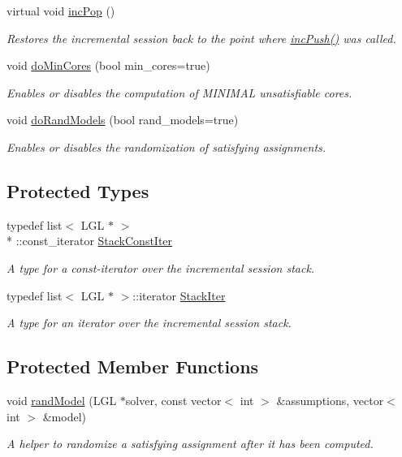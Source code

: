 \begin{DoxyCompactItemize}
virtual void \hyperlink{classLingelingApi_afe43e1243338a332803fff470eedbf7a}{inc\-Pop} ()
\begin{DoxyCompactList}\small\item\em Restores the incremental session back to the point where \hyperlink{classLingelingApi_a91c858d2a36a4fbe580909a793802a76}{inc\-Push()} was called. \end{DoxyCompactList}\item 
void \hyperlink{classSatSolver_a159fc9658709e5aeba2844a09454b2cb}{do\-Min\-Cores} (bool min\-\_\-cores=true)
\begin{DoxyCompactList}\small\item\em Enables or disables the computation of M\-I\-N\-I\-M\-A\-L unsatisfiable cores. \end{DoxyCompactList}\item 
void \hyperlink{classSatSolver_ae229c5e277350710412fce0e867dc566}{do\-Rand\-Models} (bool rand\-\_\-models=true)
\begin{DoxyCompactList}\small\item\em Enables or disables the randomization of satisfying assignments. \end{DoxyCompactList}\end{DoxyCompactItemize}
\subsection*{Protected Types}
\begin{DoxyCompactItemize}
\item 
typedef list$<$ L\-G\-L $\ast$ $>$\\*
\-::const\-\_\-iterator \hyperlink{classLingelingApi_a5c16b047da9b5bd344f30a855dac52e7}{Stack\-Const\-Iter}
\begin{DoxyCompactList}\small\item\em A type for a const-\/iterator over the incremental session stack. \end{DoxyCompactList}\item 
typedef list$<$ L\-G\-L $\ast$ $>$\-::iterator \hyperlink{classLingelingApi_aa4ab290e2a0f65677b6e58b675741535}{Stack\-Iter}
\begin{DoxyCompactList}\small\item\em A type for an iterator over the incremental session stack. \end{DoxyCompactList}\end{DoxyCompactItemize}
\subsection*{Protected Member Functions}
\begin{DoxyCompactItemize}
\item 
void \hyperlink{classLingelingApi_a1b2cec409be65f2bf885593c83d73883}{rand\-Model} (L\-G\-L $\ast$solver, const vector$<$ int $>$ \&assumptions, vector$<$ int $>$ \&model)
\begin{DoxyCompactList}\small\item\em A helper to randomize a satisfying assignment after it has been computed. \end{DoxyCompactList}\end{DoxyCompactItemize}
